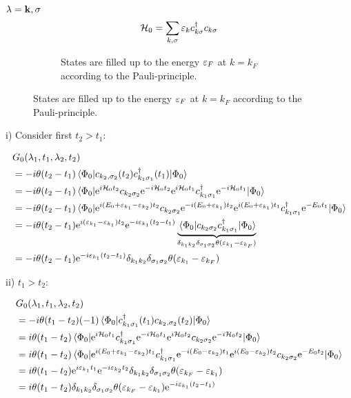 $\lambda = \vb k, \sigma$
\begin{equation} 
\mathcal{H}_0 = \sum_{k, \sigma}\varepsilon_kc^{\dagger}_{ k\sigma}c_{k\sigma}
\end{equation}



\begin{figure}
	\begin{subfigure}{\linewidth}
	\centering
	
	\end{subfigure}	
	\begin{subfigure}{\linewidth}
	\centering
	
	\caption{States are filled up to the energy $\varepsilon_F$ at $k = k_F$ according to the Pauli-principle.}
	\end{subfigure}
\end{figure}

i) Consider first $t_2 >t_1$:

\begin{align*} 
&G_0(\lambda_1, t_1, \lambda_2, t_2) \\
 &=-i\theta(t_2-t_1)\ev{c_{k_2,\sigma_2}(t_2)c_{k_1\sigma_1}^\dagger(t_1)}{\Phi_0} \\
&=-i\theta(t_2-t_1)\ev{\e^{i\Ha_0t_2}c_{k_2\sigma_2}\e^{-i\Ha_0t_2}\e^{i\Ha_0t_1}c_{k_1\sigma_1}^\dagger\e^{-i\Ha_0t_1}}{\Phi_0} \\
&= -i\theta(t_2 - t_1) \ev{\e^{i(E_0 + \ep_{k_1}-\ep_{k_2})t_2}c_{k_2\sigma_2}\e^{-i(E_0 + \ep_{k_1})t_2}\e^{i(E_0 + \ep_{k_1})t_1}c_{k_1\sigma_1}^\dagger\e^{-E_0t_1}}{\Phi_0} \\
&= -i\theta(t_2-t_1)\e^{i(\ep_{k_1}-\ep_{k_1})t_2}\e^{-i\ep_{k_1}(t_2-t_1)}\underbrace{\ev{c_{k_2\sigma_2}c_{k_1\sigma_1}^\dagger}{\Phi_0}}_{\delta_{k_1k_2}\delta_{\sigma_1\sigma_2}\theta(\ep_{k_1} - \ep_{k_F})} \\
&= -i\theta(t_2-t_1)\e^{-i\ep_{k_1}(t_2-t_1)}\delta_{k_1k_2}\delta_{\sigma_1\sigma_2}\theta(\ep_{k_1} - \ep_{k_F})
\end{align*}


ii) $t_1>t_2$:

\begin{align*} 
&G_0(\lambda_1, t_1, \lambda_2, t_2) \\
&=-i\theta(t_1-t_2)(-1)\ev{c_{k_1\sigma_1}^\dagger(t_1)c_{k_2,\sigma_2}(t_2)}{\Phi_0} \\
&=i\theta(t_1-t_2)\ev{\e^{i\Ha_0t_1}c_{k_1\sigma_1}^\dagger\e^{-i\Ha_0t_1}\e^{i\Ha_0t_2}c_{k_2\sigma_2}\e^{-i\Ha_0t_2}}{\Phi_0} \\
&= i\theta(t_1-t_2) \ev{\e^{i(E_0 + \ep_{k_1}-\ep_{k_2})t_1}c_{k_1\sigma_1}^\dagger\e^{-i(E_0 - \ep_{k_2})t_1}\e^{i(E_0 - \ep_{k_2})t_2}c_{k_2\sigma_2}\e^{-E_0t_2}}{\Phi_0} \\
&= i\theta(t_1-t_2)\e^{i\ep_{k_1}t_1}\e^{-i\ep_{k_2}t_2}\delta_{k_1k_2}\delta_{\sigma_1\sigma_2}\theta(\ep_{k_F} - \ep_{k_1}) \\
&= i\theta(t_1-t_2)\delta_{k_1k_2}\delta_{\sigma_1\sigma_2}\theta(\ep_{k_F} - \ep_{k_1})\e^{-i\ep_{k_1}(t_2-t_1)}
\end{align*}

